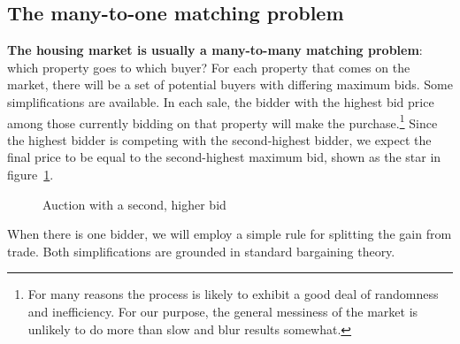 {%




\subsection{The many-to-one matching problem}
\textbf{The housing market is usually a many-to-many matching problem}: which property goes to which buyer? For each property that comes on the market, there will be a set of potential buyers with differing maximum bids. Some simplifications are available. In each sale, the bidder with the highest bid price among those currently bidding on that property will make the purchase.\footnote{For many reasons the process is likely to exhibit a good deal of randomness and inefficiency. For our purpose, the general messiness of the market is unlikely to do more than slow and blur results somewhat.} Since the highest bidder is competing with the second-highest bidder, we expect the final price to be equal to the second-highest maximum bid, shown as the star in figure~\ref{fig:auction-game}. 


    \begin{figure}
        \centering
        
        \caption{Auction with a second, higher bid}
        \label{fig:auction-game}
    \end{figure}

When there is one bidder, we will employ a simple rule for splitting the gain from trade. Both simplifications are grounded in standard bargaining theory.



}
